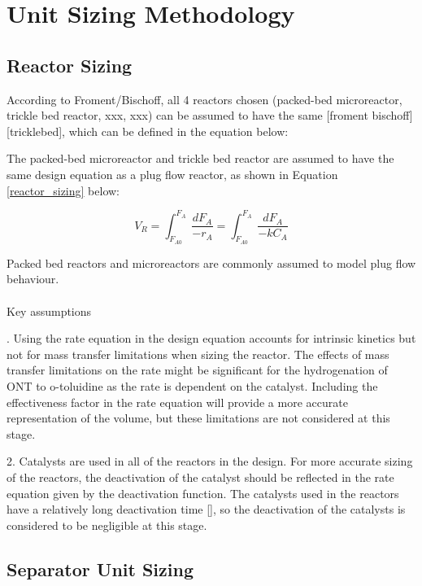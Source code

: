 \section{Unit Sizing Methodology}
\label{app:sizing}
\subsection{Reactor Sizing}
According to Froment/Bischoff, all 4 reactors chosen (packed-bed microreactor, trickle bed reactor, xxx, xxx) can be assumed to have the same [froment bischoff][tricklebed], which can be defined in the equation below:

The packed-bed microreactor and trickle bed reactor are assumed to have the same design equation as a plug flow reactor, as shown in Equation \ref{reactor_sizing} below:

\begin{equation}
    V_R = \int_{F_{A0}}^{F_{A}} \frac{dF_A}{-r_A} = \int_{F_{A0}}^{F_{A}} \frac{dF_A}{-kC_A}
    \label{reactor_sizing}
\end{equation}

Packed bed reactors and microreactors are commonly assumed to model plug flow behaviour. 

\paragraph{}{Key assumptions}
 
.  Using the rate equation in the design equation accounts for intrinsic kinetics but not for mass transfer limitations when sizing the reactor. The effects of mass transfer limitations on the rate might be significant for the hydrogenation of ONT to o-toluidine as the rate is dependent on the catalyst. Including the effectiveness factor in the rate equation will provide a more accurate representation of the volume, but these limitations are not considered at this stage.

2.  Catalysts are used in all of the reactors in the design. For more accurate sizing of the reactors, the deactivation of the catalyst should be reflected in the rate equation given by the deactivation function. The catalysts used in the reactors have a relatively long deactivation time [], so the deactivation of the catalysts is considered to be negligible at this stage. 

\subsection{Separator Unit Sizing}

